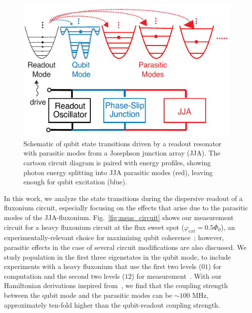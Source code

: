 \documentclass[prx,showpacs,notitlepage,twocolumn,superscriptaddress,nofootinbib,preprintnumbers,floatfix]{revtex4-2}
\begin{document}
\begin{figure}
    \centering
    \includegraphics[width=\linewidth]{Figures/Demo.pdf}
    \caption{Schematic of qubit state transitions driven by a readout resonator with parasitic modes from a Josephson junction array (JJA). The cartoon circuit diagram is paired with energy profiles, showing photon energy splitting into JJA parasitic modes (red), leaving enough for qubit excitation (blue).}
    \label{fig:demo}
\end{figure}
In this work, we analyze the state transitions during the dispersive readout of a fluxonium circuit, especially focusing on the effects that arise due to the parasitic modes of the JJA-fluxonium. Fig.~\ref{fig:meas_circuit} shows our measurement circuit for a heavy fluxonium circuit at the flux sweet spot  ($\varphi_{ext}=0.5\Phi_0$), an experimentally-relevant choice for maximizing qubit coherence~\cite{somoroff_millisecond_2023,nguyen2019high,zhang_universal_2021,manucharyan2009fluxonium}; however, parasitic effects in the case of several circuit modifications are also discussed. We study population in the first three eigenstates in the qubit mode, to include experiments with a heavy fluxonium that use the first two levels ($01$) for computation and the second two levels ($12$) for measurement~\cite{zhang_universal_2021}. %
With our Hamiltonian derivations inspired from~\cite{viola2015collective}, we find that the coupling strength between the qubit mode and the parasitic modes can be $\sim 100$ MHz, approximately ten-fold higher than the qubit-readout coupling strength. %
\end{document}
